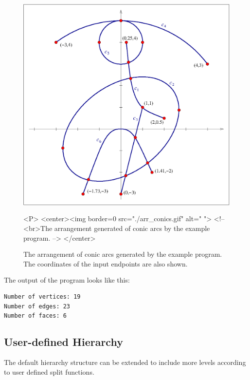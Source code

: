 \begin{itemize}
\begin{figure}[h]
\begin{ccTexOnly}
{\centerline {\includegraphics{Arrangement_2/arr_conics.ps}}}
\end{ccTexOnly}
\caption{The arrangement of conic arcs generated by the example program.
The coordinates of the input endpoints are also shown.
\label{fig:conics}}
\begin{ccHtmlOnly}
<P>
<center><img border=0 src="./arr_conics.gif" alt=" ">
<!-- <br>The arrangement generated of conic arcs by the example program. -->
</center>
\end{ccHtmlOnly}
\end{figure}


The output of the program looks like this:
\begin{verbatim}
Number of vertices: 19
Number of edges: 23
Number of faces: 6
\end{verbatim}

\begin{ccAdvanced}
\section{User-defined Hierarchy}

The default hierarchy structure can be extended to include more levels
according to user defined split functions.


\end{ccAdvanced}
\end{itemize}
